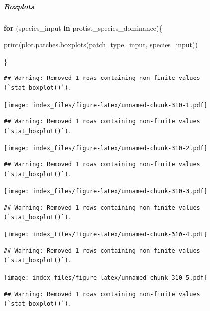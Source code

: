 \documentclass[
]{article}
\newenvironment{Shaded}{\begin{snugshade}}{\end{snugshade}}
\newcommand{\ControlFlowTok}[1]{\textcolor[rgb]{0.13,0.29,0.53}{\textbf{#1}}}
\newcommand{\FunctionTok}[1]{\textcolor[rgb]{0.00,0.00,0.00}{#1}}
\newcommand{\NormalTok}[1]{#1}
\begin{document}
\hypertarget{boxplots-20}{%
\subparagraph{Boxplots}\label{boxplots-20}}

\begin{Shaded}
\begin{Highlighting}[]
\ControlFlowTok{for}\NormalTok{ (species\_input }\ControlFlowTok{in}\NormalTok{ protist\_species\_dominance)\{}
  
  \FunctionTok{print}\NormalTok{(}\FunctionTok{plot.patches.boxplots}\NormalTok{(patch\_type\_input,}
\NormalTok{                            species\_input))}
  
\NormalTok{\}}
\end{Highlighting}
\end{Shaded}

\begin{verbatim}
## Warning: Removed 1 rows containing non-finite values (`stat_boxplot()`).
\end{verbatim}

\texttt{[image: index\_files/figure-latex/unnamed-chunk-310-1.pdf]}

\begin{verbatim}
## Warning: Removed 1 rows containing non-finite values (`stat_boxplot()`).
\end{verbatim}

\texttt{[image: index\_files/figure-latex/unnamed-chunk-310-2.pdf]}

\begin{verbatim}
## Warning: Removed 1 rows containing non-finite values (`stat_boxplot()`).
\end{verbatim}

\texttt{[image: index\_files/figure-latex/unnamed-chunk-310-3.pdf]}

\begin{verbatim}
## Warning: Removed 1 rows containing non-finite values (`stat_boxplot()`).
\end{verbatim}

\texttt{[image: index\_files/figure-latex/unnamed-chunk-310-4.pdf]}

\begin{verbatim}
## Warning: Removed 1 rows containing non-finite values (`stat_boxplot()`).
\end{verbatim}

\texttt{[image: index\_files/figure-latex/unnamed-chunk-310-5.pdf]}

\begin{verbatim}
## Warning: Removed 1 rows containing non-finite values (`stat_boxplot()`).
\end{verbatim}
\end{document}
